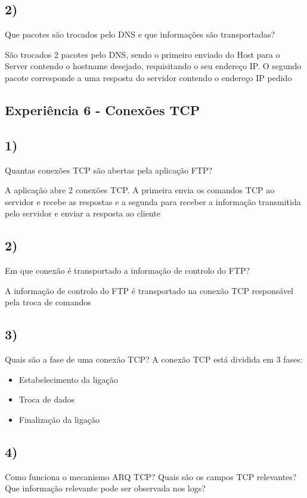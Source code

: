 \documentclass[11pt]{article}
\begin{document}
\subsection{2)} Que pacotes são trocados pelo DNS e que informações são transportadas? 

São trocados 2 pacotes pelo DNS, sendo o primeiro enviado do Host para o Server contendo o hostname desejado, requisitando o seu endereço IP. O segundo pacote corresponde a uma resposta do servidor contendo o endereço IP pedido

\subsection{Experiência 6 - Conexões TCP}

\subsection{1)} Quantas conexões TCP são abertas pela aplicação FTP?

A aplicação abre 2 conexões TCP. A primeira envia os comandos TCP ao servidor e recebe as respostas e a segunda para receber a informação transmitida pelo servidor e enviar a resposta ao cliente

\subsection{2)} Em que conexão é transportado a informação de controlo do FTP?

A informação de controlo do FTP é transportado na conexão TCP responsável pela troca de comandos

\subsection{3)} Quais são a fase de uma conexão TCP?
A conexão TCP está dividida em 3 fases:

\begin{itemize}
\item Estabelecimento da ligação
\item Troca de dados
\item Finalização da ligação
\end{itemize}

\subsection{4)} Como funciona o mecanismo ARQ TCP? Quais são os campos TCP relevantes? Que informação relevante pode ser observada nos logs?
\end{document}
